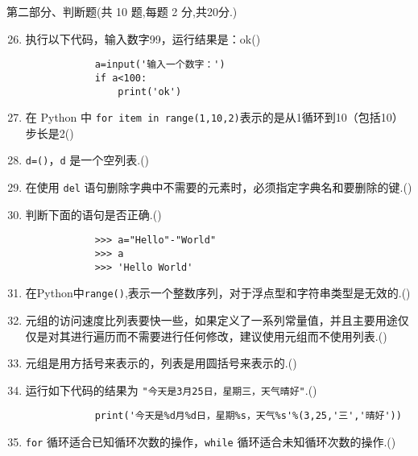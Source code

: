 \documentclass[11pt]{ctexart}
\begin{document}
    {\noindent\heiti 第二部分、判断题(共 10 题,每题 2 分,共20分.)}
    \begin{enumerate}
        \setcounter{enumi}{25}
        \item 执行以下代码，输入数字99，运行结果是：ok(\qquad)
        \begin{lstlisting}
            a=input('输入一个数字：') 
            if a<100:     
                print('ok')
        \end{lstlisting}

        \item 在 Python 中 \lstinline!for item in range(1,10,2)!表示的是从1循环到10（包括10）步长是2(\qquad)
        
        \item \lstinline!d=()!，\lstinline{d} 是一个空列表.(\qquad)
  
        \item 在使用 \lstinline{del} 语句删除字典中不需要的元素时，必须指定字典名和要删除的键.(\qquad)
        
        \item 判断下面的语句是否正确.(\qquad)
        \begin{lstlisting}
            >>> a="Hello"-"World"
            >>> a
            >>> 'Hello World'
        \end{lstlisting}
        
        \item 在Python中\lstinline!range()!,表示一个整数序列，对于浮点型和字符串类型是无效的.(\qquad)
        
        \item 元组的访问速度比列表要快一些，如果定义了一系列常量值，并且主要用途仅仅是对其进行遍历而不需要进行任何修改，建议使用元组而不使用列表.(\qquad)
        
        \item 元组是用方括号来表示的，列表是用圆括号来表示的.(\qquad)
        
        \item 运行如下代码的结果为 \lstinline!"今天是3月25日，星期三，天气晴好"!.(\qquad)
        \begin{lstlisting}
            print('今天是%d月%d日，星期%s，天气%s'%(3,25,'三','晴好'))
        \end{lstlisting}
        
        \item \lstinline{for} 循环适合已知循环次数的操作，\lstinline{while} 循环适合未知循环次数的操作.(\qquad)
    \end{enumerate}
\end{document}
